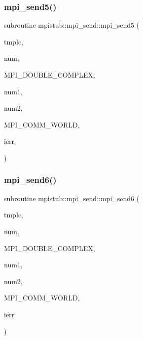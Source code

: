 \subsubsection{\texorpdfstring{mpi\_send5()}{mpi\_send5()}}
{\footnotesize\ttfamily subroutine mpistub\+::mpi\+\_\+send\+::mpi\+\_\+send5 (\begin{DoxyParamCaption}\item[{double complex, dimension(\+:,\+:)}]{tmplc,  }\item[{}]{num,  }\item[{}]{M\+P\+I\+\_\+\+D\+O\+U\+B\+L\+E\+\_\+\+C\+O\+M\+P\+L\+EX,  }\item[{}]{num1,  }\item[{}]{num2,  }\item[{}]{M\+P\+I\+\_\+\+C\+O\+M\+M\+\_\+\+W\+O\+R\+LD,  }\item[{}]{ierr }\end{DoxyParamCaption})}

\mbox{\label{interfacempistub_1_1mpi__send_ab4b6754f184fdfba39035e14d819510e}} 
\subsubsection{\texorpdfstring{mpi\_send6()}{mpi\_send6()}}
{\footnotesize\ttfamily subroutine mpistub\+::mpi\+\_\+send\+::mpi\+\_\+send6 (\begin{DoxyParamCaption}\item[{double complex, dimension(\+:,\+:,\+:)}]{tmplc,  }\item[{}]{num,  }\item[{}]{M\+P\+I\+\_\+\+D\+O\+U\+B\+L\+E\+\_\+\+C\+O\+M\+P\+L\+EX,  }\item[{}]{num1,  }\item[{}]{num2,  }\item[{}]{M\+P\+I\+\_\+\+C\+O\+M\+M\+\_\+\+W\+O\+R\+LD,  }\item[{}]{ierr }\end{DoxyParamCaption})}

\mbox{\label{interfacempistub_1_1mpi__send_a544f3d0865c606cfa68936472e684587}} 
